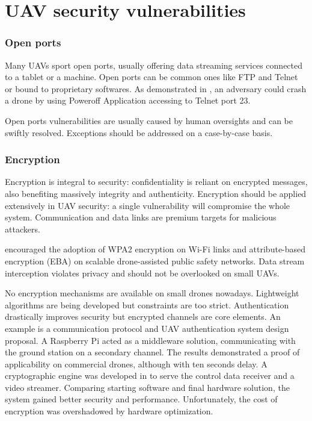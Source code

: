 \documentclass[journal]{IEEEtran}
\begin{document}
\section{UAV security vulnerabilities}

\subsubsection{Open ports}
Many UAVs sport open ports, usually offering data streaming services connected to a tablet or a machine. Open ports can be common ones like FTP and Telnet or bound to proprietary softwares. As demonstrated in \cite{dosardrone}, an adversary could crash a drone by using Poweroff Application accessing to Telnet port 23.

Open ports vulnerabilities are usually caused by human oversights and can be swiftly resolved. Exceptions should be addressed on a case-by-case basis.

\subsubsection{Encryption}
Encryption is integral to security: confidentiality is reliant on encrypted messages, also benefiting massively integrity and authenticity. Encryption should be applied extensively in UAV security: a single vulnerability will compromise the whole system. Communication and data links are premium targets for malicious attackers.

\cite{publicsafetynetworksecurity} encouraged the adoption of WPA2 encryption on Wi-Fi links and attribute-based encryption (EBA) on scalable drone-assisted public safety networks. Data stream interception violates privacy and should not be overlooked on small UAVs.

No encryption mechanisms are available on small drones nowadays. Lightweight algorithms are being developed but constraints are too strict. Authentication drastically improves security but encrypted channels are core elements. An example is \cite{encryptedchannel} a communication protocol and UAV authentication system design proposal. A Raspberry Pi acted as a middleware solution, communicating with the ground station on a secondary channel. The results demonstrated a proof of applicability on commercial drones, although with ten seconds delay. A cryptographic engine was developed in \cite{powercryptoprocessors} to serve the control data receiver and a video streamer. Comparing starting software and final hardware solution, the system gained better security and performance. Unfortunately, the cost of encryption was overshadowed by hardware optimization.
\end{document}
